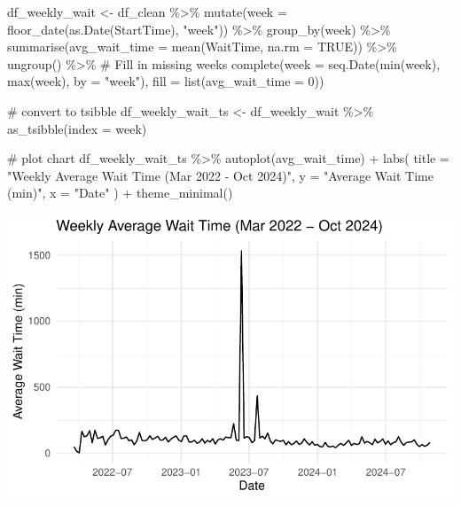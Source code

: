 \documentclass[
  letterpaper,
  DIV=11,
  numbers=noendperiod]{scrartcl}
\newenvironment{Shaded}{\begin{snugshade}}{\end{snugshade}}
\newcommand{\AttributeTok}[1]{\textcolor[rgb]{0.40,0.45,0.13}{#1}}
\newcommand{\CommentTok}[1]{\textcolor[rgb]{0.37,0.37,0.37}{#1}}
\newcommand{\ConstantTok}[1]{\textcolor[rgb]{0.56,0.35,0.01}{#1}}
\newcommand{\DecValTok}[1]{\textcolor[rgb]{0.68,0.00,0.00}{#1}}
\newcommand{\FunctionTok}[1]{\textcolor[rgb]{0.28,0.35,0.67}{#1}}
\newcommand{\NormalTok}[1]{\textcolor[rgb]{0.00,0.23,0.31}{#1}}
\newcommand{\OtherTok}[1]{\textcolor[rgb]{0.00,0.23,0.31}{#1}}
\newcommand{\SpecialCharTok}[1]{\textcolor[rgb]{0.37,0.37,0.37}{#1}}
\newcommand{\StringTok}[1]{\textcolor[rgb]{0.13,0.47,0.30}{#1}}
\begin{document}
\begin{Shaded}
\begin{Highlighting}[]
\NormalTok{df\_weekly\_wait }\OtherTok{\textless{}{-}}\NormalTok{ df\_clean }\SpecialCharTok{\%\textgreater{}\%}
  \FunctionTok{mutate}\NormalTok{(}\AttributeTok{week =} \FunctionTok{floor\_date}\NormalTok{(}\FunctionTok{as.Date}\NormalTok{(StartTime), }\StringTok{"week"}\NormalTok{)) }\SpecialCharTok{\%\textgreater{}\%}
  \FunctionTok{group\_by}\NormalTok{(week) }\SpecialCharTok{\%\textgreater{}\%}
  \FunctionTok{summarise}\NormalTok{(}\AttributeTok{avg\_wait\_time =} \FunctionTok{mean}\NormalTok{(WaitTime, }\AttributeTok{na.rm =} \ConstantTok{TRUE}\NormalTok{)) }\SpecialCharTok{\%\textgreater{}\%}
  \FunctionTok{ungroup}\NormalTok{() }\SpecialCharTok{\%\textgreater{}\%}
  \CommentTok{\# Fill in missing weeks}
  \FunctionTok{complete}\NormalTok{(}\AttributeTok{week =} \FunctionTok{seq.Date}\NormalTok{(}\FunctionTok{min}\NormalTok{(week), }\FunctionTok{max}\NormalTok{(week), }\AttributeTok{by =} \StringTok{"week"}\NormalTok{), }\AttributeTok{fill =} \FunctionTok{list}\NormalTok{(}\AttributeTok{avg\_wait\_time =} \DecValTok{0}\NormalTok{))}

\CommentTok{\# convert to tsibble}
\NormalTok{df\_weekly\_wait\_ts }\OtherTok{\textless{}{-}}\NormalTok{ df\_weekly\_wait }\SpecialCharTok{\%\textgreater{}\%}
  \FunctionTok{as\_tsibble}\NormalTok{(}\AttributeTok{index =}\NormalTok{ week)}

\CommentTok{\# plot chart}
\NormalTok{df\_weekly\_wait\_ts }\SpecialCharTok{\%\textgreater{}\%}
  \FunctionTok{autoplot}\NormalTok{(avg\_wait\_time) }\SpecialCharTok{+}
  \FunctionTok{labs}\NormalTok{(}
    \AttributeTok{title =} \StringTok{"Weekly Average Wait Time (Mar 2022 {-} Oct 2024)"}\NormalTok{, }
    \AttributeTok{y =} \StringTok{"Average Wait Time (min)"}\NormalTok{,}
    \AttributeTok{x =} \StringTok{"Date"}
\NormalTok{  ) }\SpecialCharTok{+}
  \FunctionTok{theme\_minimal}\NormalTok{()}
\end{Highlighting}
\end{Shaded}

\includegraphics{final_proj_group1_files/figure-pdf/aggregate_weekly-1.pdf}
\end{document}
